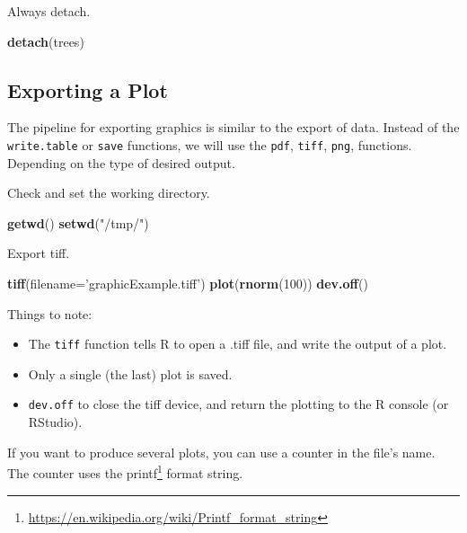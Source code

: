 \documentclass[]{book}
\newenvironment{Shaded}{\begin{snugshade}}{\end{snugshade}}
\newcommand{\DataTypeTok}[1]{\textcolor[rgb]{0.13,0.29,0.53}{#1}}
\newcommand{\DecValTok}[1]{\textcolor[rgb]{0.00,0.00,0.81}{#1}}
\newcommand{\KeywordTok}[1]{\textcolor[rgb]{0.13,0.29,0.53}{\textbf{#1}}}
\newcommand{\NormalTok}[1]{#1}
\newcommand{\StringTok}[1]{\textcolor[rgb]{0.31,0.60,0.02}{#1}}
\providecommand{\tightlist}{%
  \setlength{\itemsep}{0pt}\setlength{\parskip}{0pt}}
\renewcommand{\href}[2]{#2\footnote{\url{#1}}}
\theoremstyle{definition}
\theoremstyle{definition}
\theoremstyle{definition}
\theoremstyle{remark}
\begin{document}
Always detach.

\begin{Shaded}
\begin{Highlighting}[]
\KeywordTok{detach}\NormalTok{(trees)}
\end{Highlighting}
\end{Shaded}

\hypertarget{exporting-a-plot}{%
\subsection{Exporting a Plot}\label{exporting-a-plot}}

The pipeline for exporting graphics is similar to the export of data.
Instead of the \texttt{write.table} or \texttt{save} functions, we will use the \texttt{pdf}, \texttt{tiff}, \texttt{png}, functions. Depending on the type of desired output.

Check and set the working directory.

\begin{Shaded}
\begin{Highlighting}[]
\KeywordTok{getwd}\NormalTok{()}
\KeywordTok{setwd}\NormalTok{(}\StringTok{"/tmp/"}\NormalTok{)}
\end{Highlighting}
\end{Shaded}

Export tiff.

\begin{Shaded}
\begin{Highlighting}[]
\KeywordTok{tiff}\NormalTok{(}\DataTypeTok{filename=}\StringTok{'graphicExample.tiff'}\NormalTok{)}
\KeywordTok{plot}\NormalTok{(}\KeywordTok{rnorm}\NormalTok{(}\DecValTok{100}\NormalTok{))}
\KeywordTok{dev.off}\NormalTok{()}
\end{Highlighting}
\end{Shaded}

Things to note:

\begin{itemize}
\tightlist
\item
  The \texttt{tiff} function tells R to open a .tiff file, and write the output of a plot.
\item
  Only a single (the last) plot is saved.
\item
  \texttt{dev.off} to close the tiff device, and return the plotting to the R console (or RStudio).
\end{itemize}

If you want to produce several plots, you can use a counter in the file's name. The counter uses the \href{https://en.wikipedia.org/wiki/Printf_format_string}{printf} format string.
\end{document}

